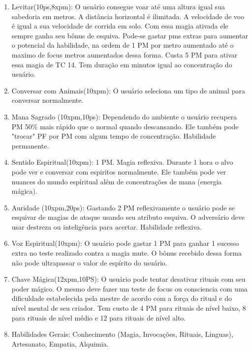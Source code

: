 \begin{enumerate}
\item Levitar(10ps,8xpm): O usuário consegue voar até uma altura igual sua sabedoria em metros. A distância horizontal é ilimitada. A velocidade de voo é igual a sua velocidade de corrida em solo. Com essa magia ativada ele sempre ganha seu bônus de esquiva. Pode-se gastar pms extras para aumentar o potencial da habilidade, na ordem de 1 PM por metro aumentado até o maximo de focus metros aumentados dessa forma. Custa 5 PM para ativar essa magia de TC 14. Tem duração em minutos igual ao concentração do usuário.
 	
 	 	\item Conversar com Animais(10xpm): O usuário seleciona um tipo de animal para conversar normalmente. 
  
  	  
	 	\item Mana Sagrado (10xpm,10ps): Dependendo do ambiente o usuário recupera PM 50\% mais rápido que o normal quando descansando. Ele também pode "trocar" PF por PM com algum tempo de concentração. Habilidade permanente.  
  	
	 	\item Sentido Espiritual(10xpm): 1 PM. Magia reflexiva.\newline
Durante 1 hora o alvo pode ver e conversar com espiritos normalmente. Ele também pode ver nuances do mundo espíritual além de concentrações de mana (energia mágica). 
  
	\item Auridade (10xpm,20ps): Gastando 2 PM reflexivamente o usuário pode se esquivar de magias de ataque usando seu atributo esquiva. O adversário deve usar destreza ou inteligência para acertar. Habilidade reflexiva. 
		
	\item  Voz Espiritual(10xpm): O usuário pode gastar 1 PM para ganhar 1 sucesso extra no teste realizado contra a magia mute. O bônus recebido dessa forma não pode ultrapassar o valor de espírito do usuário.

	\item  Chave Mágica(12xpm,10PS): O usuário pode tentar desativar rituais com seu poder mágico. O mesmo deve fazer um teste de focus ou consciencia com uma dificuldade estabelecida pela mestre de acordo com a força do ritual e do nível mental de seu criador. Tem custo de 4 PM para rituais de nível baixo, 8 para rituais de nível médio e 12 para rituais de nível alto.

  \item Habilidades Gerais: Conhecimento (Magia, Invocações, Rituais, Linguas), Artesanato, Empatia, Alquimia.

\end{enumerate}


